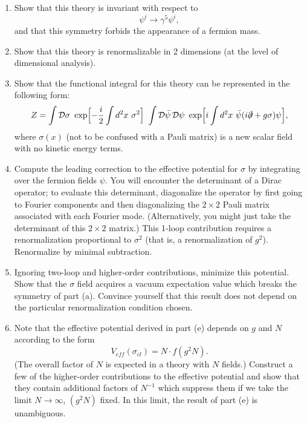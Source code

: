 \begin{enumerate}[label=(\alph*)]
  \item Show that this theory is invariant with respect to
    \begin{equation}
      \psi^i \to \gamma^5\psi^i ,
    \end{equation}
    and that this symmetry forbids the appearance of a fermion mass.
  \item Show that this theory is renormalizable in 2 dimensions (at the level
    of dimensional analysis).
  \item Show that the functional integral for this theory can be represented
    in the following form:
    \begin{equation}
      Z = \int \mathcal{D}\sigma\ \exp\Bigl[ -\frac{i}{2}\int d^2x\ \sigma^2
        \Bigr]\ \int \mathcal{D}\bar{\psi}\,\mathcal{D}\psi\ \exp\Bigl[
        i\int d^2x\ \bar{\psi}(i\slashed{\partial} + g\sigma)\psi \Bigr] ,
    \end{equation}
    where $\sigma(x)$ (not to be confused with a Pauli matrix) is a new
    scalar field with no kinetic energy terms.
  \item Compute the leading correction to the effective potential for
    $\sigma$ by integrating over the fermion fields $\psi$.  You will
    encounter the determinant of a Dirac operator; to evaluate this
    determinant, diagonalize the operator by first going to Fourier
    components and then diagonalizing the $2\times2$ Pauli matrix associated
    with each Fourier mode.  (Alternatively, you might just take the
    determinant of this $2\times2$ matrix.)  This 1-loop contribution requires
    a renormalization proportional to $\sigma^2$ (that is, a renormalization
    of $g^2$).  Renormalize by minimal subtraction.
  \item Ignoring two-loop and higher-order contributions, minimize this
    potential.  Show that the $\sigma$ field acquires a vacuum expectation
    value which breaks the symmetry of part (a).  Convince yourself that this
    result does not depend on the particular renormalization condition
    chosen.
  \item Note that the effective potential derived in part (e) depends on $g$
    and $N$ according to the form
    \begin{equation}
      V_{eff}(\sigma_{cl}) = N\cdot f(g^2N) .
    \end{equation}
    (The overall factor of $N$ is expected in a theory with $N$ fields.)
    Construct a few of the higher-order contributions to the effective
    potential and show that they contain additional factors of $N^{-1}$ which
    suppress them if we take the limit $N\to\infty$, $(g^2N)$ fixed.  In this
    limit, the result of part (e) is unambiguous.
\end{enumerate}
